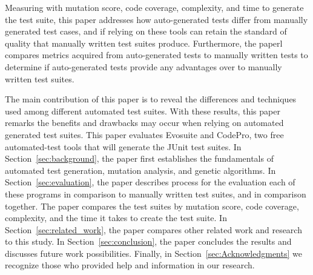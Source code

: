 Measuring with mutation score, code coverage, complexity, and time to generate the test suite, this paper addresses how auto-generated tests differ from manually generated test cases, and if relying on these tools can retain the standard of quality that manually written test suites produce. Furthermore, the paperl compares metrics acquired from auto-generated tests to manually written tests to determine if auto-generated tests provide any advantages over to manually written test suites.

The main contribution of this paper is to reveal the differences and techniques used among different automated test suites. With these results, this paper remarks the benefits and drawbacks may occur when relying on automated generated test suites. This paper evaluates Evosuite and CodePro, two free automated-test tools that will generate the JUnit test suites. In Section~\ref{sec:background}, the paper first establishes the fundamentals of automated test generation, mutation analysis, and genetic algorithms. In Section~\ref{sec:evaluation}, the paper describes process for the evaluation each of these programs in comparison to manually written test suites, and in comparison together. The paper compares the test suites by mutation score, code coverage, complexity, and the time it takes to create the test suite. In Section~\ref{sec:related_work}, the paper compares other related work and research to this study. In Section~\ref{sec:conclusion}, the paper concludes the results and discusses future work possibilities. Finally, in Section~\ref{sec:Acknowledgments} we recognize those who provided help and information in our research.
